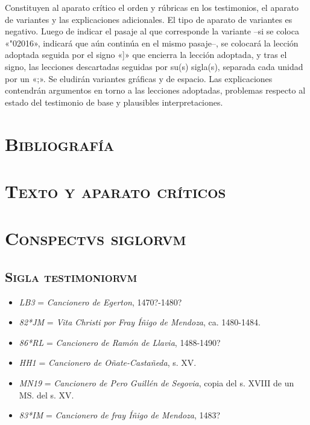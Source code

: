 \documentclass[11pt,a4paper,twoside]{article}
\newcommand{\comillas}[1]{«#1»}
\newcommand{\eg}{{\emph{LB3}}}
\newcommand{\jm}{\emph{82*JM}}
\newcommand{\rl}{\emph{86*RL}}
\newcommand{\hh}{\emph{HH1}}
\newcommand{\mn}{\emph{MN19}}
\newcommand{\im}{\emph{83*IM}}
\begin{document}
%
Constituyen al aparato crítico el orden y rúbricas en los testimonios, el aparato de variantes y las explicaciones adicionales. El tipo de aparato de variantes es negativo. Luego de indicar el pasaje al que corresponde la variante --si se coloca \comillas{\char"02016}, indicará que aún continúa en el mismo pasaje--, se colocará la lección adoptada seguida por el signo \comillas{]} que encierra la lección adoptada, y tras el signo, las lecciones descartadas seguidas por su(s) sigla(s), separada cada unidad por un \comillas{;}. Se eludirán variantes gráficas y de espacio. Las explicaciones contendrán argumentos en torno a las lecciones adoptadas, problemas respecto al estado del testimonio de base y plausibles interpretaciones.\par
\relax

\section*{\centering \textsc{Bibliografía}}
\nocite{*}
\printbibliography[heading=none]
\newpage

\section*{\centering \textsc{Texto y aparato críticos}}
\newpage

\section*{\centering \textsc{Conspectvs siglorvm}}

\subsection*{\centering\normalsize \textsc{Sigla testimoniorvm}}
\vspace*{-2.5pt}
\begin{itemize}[label=,leftmargin=0.6cm]%
\item {\eg} = \emph{Cancionero de Egerton}, 1470?-1480?
\item {\jm} = \emph{Vita Christi por Fray Íñigo de Mendoza}, ca. 1480-1484.
\item {\rl} = \emph{Cancionero de Ramón de Llavia}, 1488-1490?
\item {\hh} = \emph{Cancionero de Oñate-Castañeda}, s. XV.
\item {\mn} = \emph{Cancionero de Pero Guillén de Segovia}, copia del s. XVIII de un MS. del s. XV.
\item {\im} = \emph{Cancionero de fray Íñigo de Mendoza}, 1483?%
\end{itemize}
\end{document}

